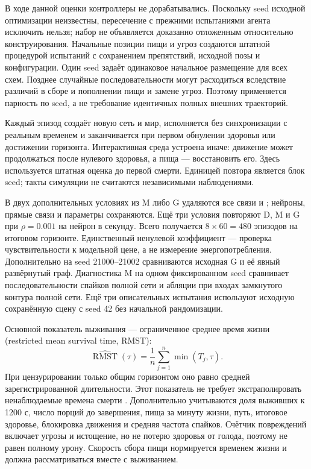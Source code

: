 \documentclass[11pt]{article}
\begin{document}
В ходе данной оценки контроллеры не дорабатывались. Поскольку seed исходной оптимизации неизвестны, пересечение с прежними испытаниями агента исключить нельзя; набор не объявляется доказанно отложенным относительно конструирования. Начальные позиции пищи и угроз создаются штатной процедурой испытаний с сохранением препятствий, исходной позы и конфигурации. Один seed задаёт одинаковое начальное размещение для всех схем. Позднее случайные последовательности могут расходиться вследствие различий в сборе и пополнении пищи и замене угроз. Поэтому применяется парность по seed, а не требование идентичных полных внешних траекторий.

Каждый эпизод создаёт новую сеть и мир, исполняется без синхронизации с реальным временем и заканчивается при первом обнулении здоровья или достижении горизонта. Интерактивная среда устроена иначе: движение может продолжаться после нулевого здоровья, а пища --- восстановить его. Здесь используется штатная оценка до первой смерти. Единицей повтора является блок seed; такты симуляции не считаются независимыми наблюдениями.

В двух дополнительных условиях из M либо G удаляются все связи  и ; нейроны, прямые связи и параметры сохраняются. Ещё три условия повторяют D, M и G при $\rho=0.001$ на нейрон в секунду. Всего получается $8\times60=480$ эпизодов на итоговом горизонте. Единственный ненулевой коэффициент --- проверка чувствительности к модельной цене, а не измерение энергопотребления. Дополнительно на seed 21000--21002 сравниваются исходная G и её явный развёрнутый граф. Диагностика M на одном фиксированном seed сравнивает последовательности спайков полной сети и абляции при входах замкнутого контура полной сети. Ещё три описательных испытания используют исходную сохранённую сцену с seed 42 без начальной рандомизации.

Основной показатель выживания --- ограниченное среднее время жизни (restricted mean survival time, RMST):
\begin{equation}
\widehat{\operatorname{RMST}}(\tau)=\frac{1}{n}\sum_{j=1}^n\min(T_j,\tau).
\end{equation}
При цензурировании только общим горизонтом оно равно средней зарегистрированной длительности. Этот показатель не требует экстраполировать ненаблюдаемые времена смерти \citep{royston2013}. Дополнительно учитываются доля выживших к 1200 с, число порций до завершения, пища за минуту жизни, путь, итоговое здоровье, блокировка движения и средняя частота спайков. Счётчик повреждений включает угрозы и истощение, но не потерю здоровья от голода, поэтому не равен полному урону. Скорость сбора пищи нормируется временем жизни и должна рассматриваться вместе с выживанием.
\end{document}
